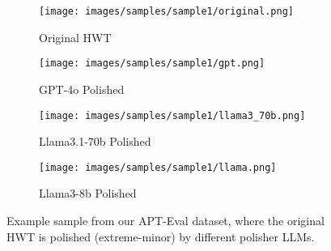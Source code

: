 \begin{figure*}[htbp]
    \centering
    \begin{minipage}{\textwidth} %
        \centering
        \begin{subfigure}{0.7\textwidth}
            \centering
            \texttt{[image: images/samples/sample1/original.png]}
            \caption{Original HWT}
        \end{subfigure}
    \end{minipage}

    \vspace{0.5cm} %
    \begin{minipage}{\textwidth} %
        \centering
        \begin{subfigure}{0.7\textwidth}
            \centering
            \texttt{[image: images/samples/sample1/gpt.png]}
            \caption{GPT-4o Polished}
        \end{subfigure}
    \end{minipage}

    \vspace{0.5cm} %
    \begin{minipage}{\textwidth} %
        \centering
        \begin{subfigure}{0.7\textwidth}
            \centering
            \texttt{[image: images/samples/sample1/llama3\_70b.png]}
            \caption{Llama3.1-70b Polished}
        \end{subfigure}
    \end{minipage}

    \vspace{0.5cm} %
    \begin{minipage}{\textwidth} %
        \centering
        \begin{subfigure}{0.7\textwidth}
            \centering
            \texttt{[image: images/samples/sample1/llama.png]}
            \caption{Llama3-8b Polished}
        \end{subfigure}
    \end{minipage}
    
    
    \caption{Example sample from our APT-Eval dataset, where the original HWT is polished (extreme-minor) by different polisher LLMs.}
    \label{fig:sample_exmpl_1}
\end{figure*}


